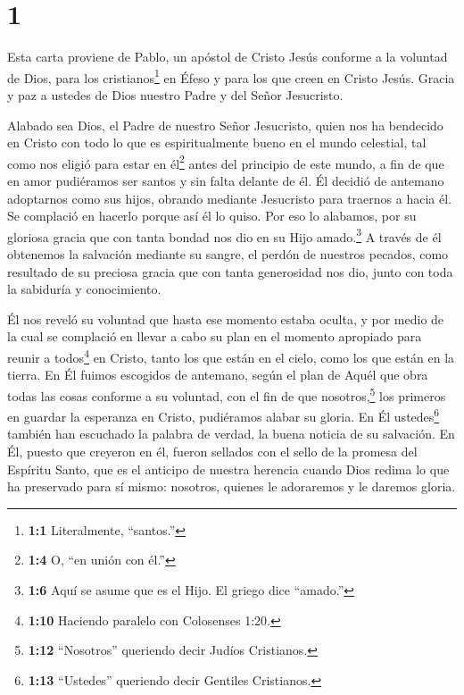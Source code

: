 \hypertarget{section}{%
\section{1}\label{section}}

 Esta carta proviene de Pablo, un apóstol de Cristo Jesús
conforme a la voluntad de Dios, para los cristianos\footnote{\textbf{1:1}
  Literalmente, ``santos.''} en Éfeso y para los que creen en Cristo
Jesús.  Gracia y paz a ustedes de Dios nuestro Padre y del
Señor Jesucristo.

 Alabado sea Dios, el Padre de nuestro Señor Jesucristo,
quien nos ha bendecido en Cristo con todo lo que es espiritualmente
bueno en el mundo celestial,  tal como nos eligió para estar
en él\footnote{\textbf{1:4} O, ``en unión con él.''} antes del principio
de este mundo, a fin de que en amor pudiéramos ser santos y sin falta
delante de él.  Él decidió de antemano adoptarnos como sus
hijos, obrando mediante Jesucristo para traernos a hacia él. Se
complació en hacerlo porque así él lo quiso.  Por eso lo
alabamos, por su gloriosa gracia que con tanta bondad nos dio en su Hijo
amado.\footnote{\textbf{1:6} Aquí se asume que es el Hijo. El griego
  dice ``amado.''}  A través de él obtenemos la salvación
mediante su sangre, el perdón de nuestros pecados, como resultado de su
preciosa gracia  que con tanta generosidad nos dio, junto
con toda la sabiduría y conocimiento.

 Él nos reveló su voluntad que hasta ese momento estaba
oculta, y por medio de la cual se complació en llevar a cabo su plan
 en el momento apropiado para reunir a todos\footnote{\textbf{1:10}
  Haciendo paralelo con Colosenses 1:20.} en Cristo, tanto los que están
en el cielo, como los que están en la tierra.  En Él fuimos
escogidos de antemano, según el plan de Aquél que obra todas las cosas
conforme a su voluntad,  con el fin de que
nosotros,\footnote{\textbf{1:12} ``Nosotros'' queriendo decir Judíos
  Cristianos.} los primeros en guardar la esperanza en Cristo,
pudiéramos alabar su gloria.  En Él ustedes\footnote{\textbf{1:13}
  ``Ustedes'' queriendo decir Gentiles Cristianos.} también han
escuchado la palabra de verdad, la buena noticia de su salvación. En Él,
puesto que creyeron en él, fueron sellados con el sello de la promesa
del Espíritu Santo,  que es el anticipo de nuestra herencia
cuando Dios redima lo que ha preservado para sí mismo: nosotros, quienes
le adoraremos y le daremos gloria.

